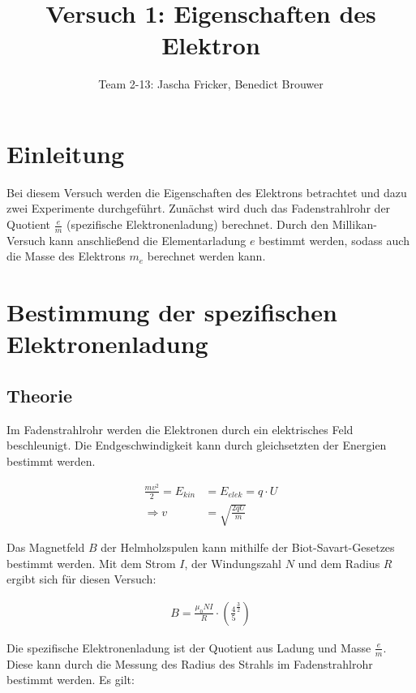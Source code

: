 \documentclass[11pt, a4paper]{article}
\title{Versuch 1: Eigenschaften des Elektron}
\author{Team 2-13: Jascha Fricker, Benedict Brouwer}
\begin{document}
    \maketitle


    \tableofcontents

    \newpage

    \section{Einleitung}

    Bei diesem Versuch werden die Eigenschaften des Elektrons betrachtet und dazu zwei Experimente durchgeführt. Zunächst wird duch das Fadenstrahlrohr
    der Quotient $\frac{e}{m}$ (spezifische Elektronenladung) berechnet. Durch den Millikan-Versuch kann anschließend die Elementarladung $e$ bestimmt
    werden, sodass auch die Masse des Elektrons $m_e$ berechnet werden kann.

    \section{Bestimmung der spezifischen Elektronenladung}

    \subsection{Theorie}

    Im Fadenstrahlrohr werden die Elektronen durch ein elektrisches Feld beschleunigt. Die Endgeschwindigkeit kann durch gleichsetzten der Energien bestimmt werden.

    \begin{align}
    \frac{mv^2}{2} = E_{kin} &= E_{elek} = q \cdot U \label{geschw}\\
    \Rightarrow v &= \sqrt{\frac{2qU}{m}}
    \end{align}
    
    Das Magnetfeld $B$ der Helmholzspulen kann mithilfe der Biot-Savart-Gesetzes bestimmt werden.
    Mit dem Strom $I$, der Windungszahl $N$ und dem Radius $R$ ergibt sich für diesen Versuch:

    \begin{align}
        B = \frac{\mu_0 N I}{R} \cdot \left(\frac{4}{5}^{\frac{3}{2}}\right) \label{B-Helm}
    \end{align}

    Die spezifische Elektronenladung ist der Quotient aus Ladung und Masse $\frac{e}{m}$.
    Diese kann durch die Messung des Radius des Strahls im Fadenstrahlrohr bestimmt werden. Es gilt:
\end{document}
